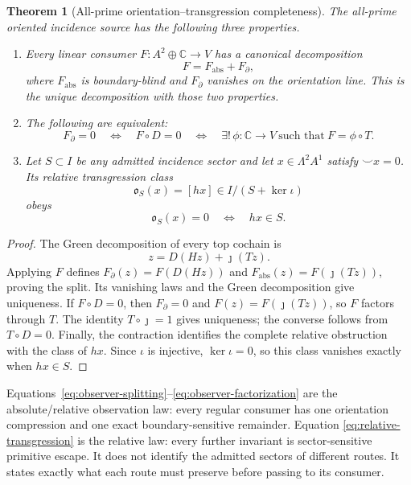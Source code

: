 \documentclass[11pt]{article}
\newtheorem{theorem}{Theorem}[section]
\theoremstyle{definition}
\theoremstyle{remark}
\newcommand{\C}{\mathbb C}
\begin{document}
\begin{theorem}[All-prime orientation--transgression completeness]
\label{thm:orientation}
The all-prime oriented incidence source has the following three
properties.
\begin{enumerate}[label=\textup{(\roman*)},leftmargin=2.2em]
\item Every linear consumer \(F:A^2\oplus\C\to V\) has a canonical
      decomposition
      \[
                         F=F_{\mathrm{abs}}+F_{\partial},
      \tag{5.2}\label{eq:observer-splitting}
      \]
      where \(F_{\mathrm{abs}}\) is boundary-blind and
      \(F_{\partial}\) vanishes on the orientation line.  This is the
      unique decomposition with those two properties.
\item The following are equivalent:
      \[
      F_{\partial}=0
      \quad\Longleftrightarrow\quad F\circ D=0
      \quad\Longleftrightarrow\quad
      \exists!\,\phi:\C\to V\ \text{such that}\ F=\phi\circ T.
      \tag{5.3}\label{eq:observer-factorization}
      \]
\item Let \(S\subset I\) be any admitted incidence sector and let
      \(x\in\Lambda^2A^1\) satisfy \(\smile x=0\).  Its relative
      transgression class
      \[
                         \mathfrak o_S(x)=[h x]
                         \in I/(S+\ker\iota)
      \]
      obeys
      \[
                         \mathfrak o_S(x)=0
                         \quad\Longleftrightarrow\quad
                         h x\in S.
      \tag{5.4}\label{eq:relative-transgression}
      \]
\end{enumerate}
\end{theorem}

\begin{proof}
The Green decomposition of every top cochain is
\[
                       z=D(H z)+\jmath(Tz).
\]
Applying \(F\) defines
\(F_{\partial}(z)=F(D(H z))\) and
\(F_{\mathrm{abs}}(z)=F(\jmath(Tz))\), proving the split.  Its vanishing
laws and the Green decomposition give uniqueness.  If \(F\circ D=0\),
then \(F_{\partial}=0\) and \(F(z)=F(\jmath(Tz))\), so \(F\) factors
through \(T\).  The identity \(T\circ\jmath=1\) gives uniqueness; the
converse follows from \(T\circ D=0\).  Finally, the contraction identifies
the complete relative obstruction with the class of \(hx\).  Since
\(\iota\) is injective, \(\ker\iota=0\), so this class vanishes exactly
when \(hx\in S\).
\end{proof}

Equations~\eqref{eq:observer-splitting}--\eqref{eq:observer-factorization}
are the absolute/relative observation law: every regular consumer has one
orientation compression and one exact boundary-sensitive remainder.
Equation
\eqref{eq:relative-transgression} is the relative law: every further
invariant is sector-sensitive primitive escape.  It does not identify
the admitted sectors of different routes.  It states exactly what each
route must preserve before passing to its consumer.
\end{document}
